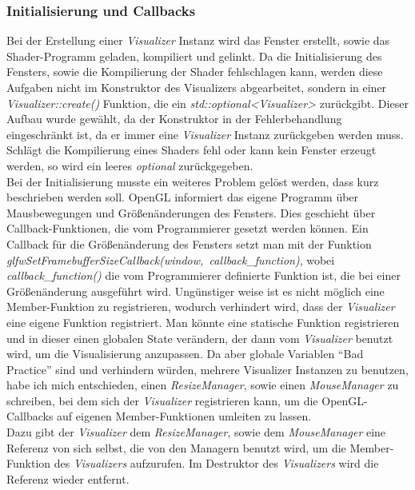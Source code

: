 \documentclass[11pt,a4paper]{article}
\begin{document}
\subsubsection{Initialisierung und Callbacks}
Bei der Erstellung einer \mbox{\textit{Visualizer}} Instanz wird das Fenster erstellt, sowie das Shader-Programm geladen, kompiliert und gelinkt. Da die Initialisierung des Fensters, sowie die Kompilierung der Shader fehlschlagen kann, werden diese Aufgaben nicht im Konstruktor des Visualizers abgearbeitet, sondern in einer \mbox{\textit{Visualizer::create()}} Funktion, die ein \mbox{\textit{std::optional<Visualizer>}} zurückgibt. Dieser Aufbau wurde gewählt, da der Konstruktor in der Fehlerbehandlung eingeschränkt ist, da er immer eine \mbox{\textit{Visualizer}} Instanz zurückgeben werden muss. Schlägt die Kompilierung eines Shaders fehl oder kann kein Fenster erzeugt werden, so wird ein leeres \mbox{\textit{optional}} zurückgegeben.\\
Bei der Initialisierung musste ein weiteres Problem gelöst werden, dass kurz beschrieben werden soll. OpenGL informiert das eigene Programm über Mausbewegungen und Größenänderungen des Fensters. Dies geschieht über Callback-Funktionen, die vom Programmierer gesetzt werden können. Ein Callback für die Größenänderung des Fensters setzt man mit der Funktion \mbox{\textit{glfwSetFramebufferSizeCallback(window, callback\_function)}}, wobei \mbox{\textit{callback\_function()}} die vom Programmierer definierte Funktion ist, die bei einer Größenänderung ausgeführt wird. Ungünstiger weise ist es nicht möglich eine Member-Funktion zu registrieren, wodurch verhindert wird, dass der \mbox{\textit{Visualizer}} eine eigene Funktion registriert. Man könnte eine statische Funktion registrieren und in dieser einen globalen State verändern, der dann vom \mbox{\textit{Visualizer}} benutzt wird, um die Visualisierung anzupassen. Da aber globale Variablen ``Bad Practice'' sind und verhindern würden, mehrere Visualizer Instanzen zu benutzen, habe ich mich entschieden, einen \mbox{\textit{ResizeManager}}, sowie einen \mbox{\textit{MouseManager}} zu schreiben, bei dem sich der \mbox{\textit{Visualizer}} registrieren kann, um die OpenGL-Callbacks auf eigenen Member-Funktionen umleiten zu lassen.\\
Dazu gibt der \mbox{\textit{Visualizer}} dem \mbox{\textit{ResizeManager}}, sowie dem \mbox{\textit{MouseManager}} eine Referenz von sich selbst, die von den Managern benutzt wird, um die Member-Funktion des \mbox{\textit{Visualizers}} aufzurufen. Im Destruktor des \mbox{\textit{Visualizers}} wird die Referenz wieder entfernt.
\end{document}
